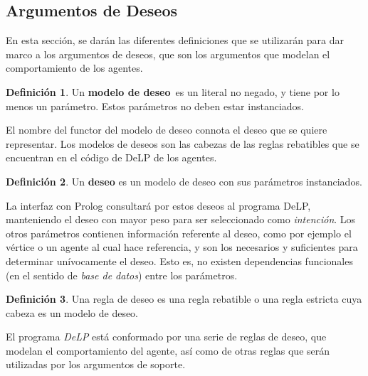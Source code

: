 \documentclass[oneside]{book}
\theoremstyle{definition}
\newtheorem{definicion}{Definición}[section]
\theoremstyle{example}
\begin{document}
\subsection{Argumentos de Deseos}

\label{sec:argumentosDeseos}

En esta sección, se darán las diferentes definiciones que se utilizarán para dar marco a los
argumentos de deseos, que son los argumentos que modelan el comportamiento de los agentes.
%

\begin{definicion}
	Un \textbf{modelo de deseo}\ es un literal no negado, 
	y tiene por lo menos un parámetro. Estos parámetros
	no deben estar instanciados.
\end{definicion}


El nombre del functor del modelo de deseo connota el deseo que se quiere representar. Los 
modelos de deseos son las cabezas de las reglas rebatibles que se encuentran en el código 
de DeLP de los agentes. 


\begin{definicion}
	Un \textbf{deseo} es un modelo de deseo con sus parámetros instanciados.
\end{definicion}

La interfaz con Prolog consultará por estos deseos al programa DeLP, manteniendo el deseo con
mayor peso para ser seleccionado como \emph{intención}. Los otros parámetros contienen 
información referente al deseo, como por ejemplo el vértice o un agente al cual hace 
referencia, y son los necesarios y suficientes para determinar unívocamente el deseo. Esto 
es, no existen dependencias funcionales (en el sentido de \emph{base de datos}) entre los 
parámetros.


\begin{definicion}
Una {regla de deseo} es una regla rebatible o una regla estricta cuya cabeza es un modelo 
de deseo.
\end{definicion}

El programa \textit{DeLP} está conformado por una serie de reglas de deseo, que modelan
el comportamiento del agente, así como de otras reglas que serán utilizadas por los 
argumentos de soporte.
\end{document}
